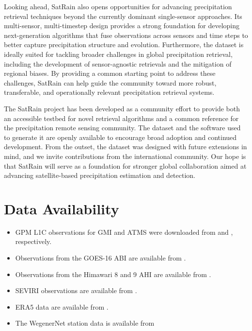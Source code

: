 \documentclass[11pt]{article}
\begin{document}
Looking ahead, SatRain also opens opportunities for advancing precipitation
retrieval techniques beyond the currently dominant single-sensor approaches. Its
multi-sensor, multi-timestep design provides a strong foundation for developing
next-generation algorithms that fuse observations across sensors and time steps
to better capture precipitation structure and evolution. Furthermore, the
dataset is ideally suited for tackling broader challenges in global
precipitation retrieval, including the development of sensor-agnostic retrievals
and the mitigation of regional biases. By providing a common starting point to
address these challenges, SatRain can help guide the community toward more
robust, transferable, and operationally relevant precipitation retrieval
systems.

The SatRain project has been developed as a community effort to provide both an
accessible testbed for novel retrieval algorithms and a common reference for the
precipitation remote sensing community. The dataset and the software used to
generate it are openly available to encourage broad adoption and continued
development. From the outset, the dataset was designed with future extensions in
mind, and we invite contributions from the international community. Our hope is
that SatRain will serve as a foundation for stronger global collaboration aimed
at advancing satellite-based precipitation estimation and detection.

\section{Data Availability}

\begin{itemize}
\item GPM L1C observations for GMI and ATMS were downloaded from \cite{Berg2022_GMI_L1C_R_V07} and \cite{Berg2022_ATMS_NOAA20_1C_V07}, respectively.
\item Observations from the GOES-16 ABI are available from \cite{NOAA_GOES_AWS}.
\item Observations from the Himawari 8 and 9 AHI are available from \cite{NOAA_HIMAWARI_AWS}.
\item SEVIRI observations are available from \cite{EUMETSAT_SEVIRI}.
\item ERA5 data are available from \cite{CDS_ERA5}.
\item The WegenerNet station data is available from \cite{WegenerNet2025}
\end{itemize}
\end{document}
